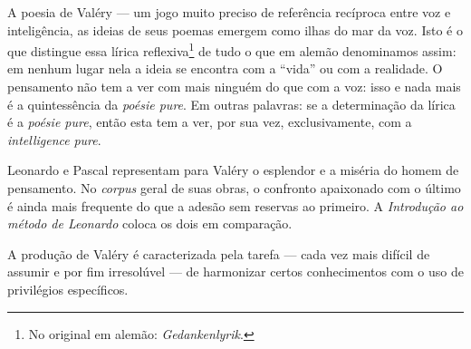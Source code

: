 A poesia de Valéry --- um jogo muito preciso de referência recíproca entre
voz e inteligência, as ideias de seus poemas emergem como ilhas do mar
da voz. Isto é o que distingue essa lírica reflexiva\footnote{No
  original em alemão: \emph{Gedankenlyrik}. \versal{[N. T.]}} de tudo o que em alemão denominamos
assim: em nenhum lugar nela a ideia se encontra com a ``vida'' ou com a
realidade. O pensamento não tem a ver com mais ninguém do que com a voz:
isso e nada mais é a quintessência da \emph{poésie pure}. Em outras
palavras: se a determinação da lírica é a \emph{poésie pure}, então esta
tem a ver, por sua vez, exclusivamente, com a \emph{intelligence}
\emph{pure}.

Leonardo e Pascal representam para Valéry o esplendor e a miséria do
homem de pensamento. No \emph{corpus} geral de suas obras, o confronto
apaixonado com o último é ainda mais frequente do que a adesão sem
reservas ao primeiro. A \emph{Introdução ao método de Leonardo} coloca os
dois em comparação.

A produção de Valéry é caracterizada pela tarefa --- cada vez mais
difícil de assumir e por fim irresolúvel --- de harmonizar certos
conhecimentos com o uso de privilégios específicos.

